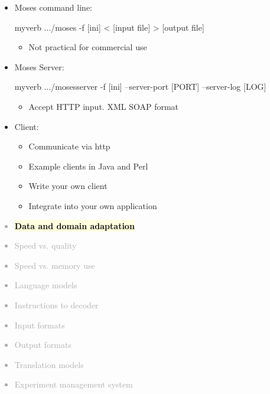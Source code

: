 \documentclass[landscape]{uedslides2C}
\newcommand{\currenttopic}[1]{\colorbox{lightyellow}{\textcolor{black}{\bf #1}}}
\begin{document}

\begin{itemize} \itemsep -1mm
\item Moses command line:
\begin{SaveVerbatim}{myverb} 
  .../moses -f [ini] < [input file] > [output file]
\end{SaveVerbatim}
\colorbox{gray}{}
    \begin{itemize}
      \item Not practical for commercial use
    \end{itemize}


\item Moses Server:
    \begin{SaveVerbatim}{myverb} 
 .../mosesserver -f [ini] --server-port [PORT] --server-log [LOG]
    \end{SaveVerbatim}
    \colorbox{gray}{}
    \begin{itemize}
      \item Accept HTTP input. XML SOAP format
    \end{itemize}

\item Client:
    \begin{itemize}
      \item Communicate via http
      \item Example clients in Java and Perl
      \item Write your own client
      \item Integrate into your own application
    \end{itemize}
    
\end{itemize}


\vspace{-5mm}
\textcolor{darkgrey}{
\begin{itemize} \itemsep -1mm
\item \currenttopic{Data and domain adaptation}
\item Speed vs. quality
\item Speed vs. memory use
\item Language models
\item Instructions to decoder
\item Input formats
\item Output formats
\item Translation models
\item Experiment management system
\end{itemize}
}
\end{document}
